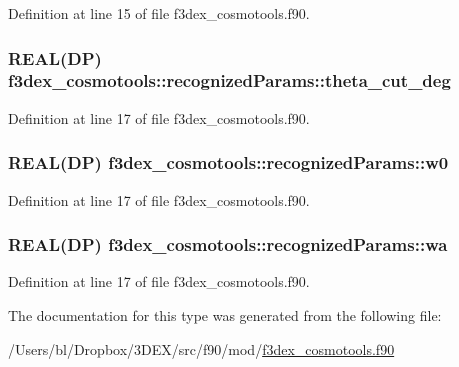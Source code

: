 Definition at line 15 of file f3dex\_\-cosmotools.f90.

\hypertarget{typef3dex__cosmotools_1_1recognized_params_ad67dc289e96be582ba36b4a960d36467}{
\subsubsection[{theta\_\-cut\_\-deg}]{\setlength{\rightskip}{0pt plus 5cm}REAL(DP) {\bf f3dex\_\-cosmotools::recognizedParams::theta\_\-cut\_\-deg}}}
\label{typef3dex__cosmotools_1_1recognized_params_ad67dc289e96be582ba36b4a960d36467}


Definition at line 17 of file f3dex\_\-cosmotools.f90.

\hypertarget{typef3dex__cosmotools_1_1recognized_params_acd2fc10976a6a78c250ab29f9a2fa547}{
\subsubsection[{w0}]{\setlength{\rightskip}{0pt plus 5cm}REAL(DP) {\bf f3dex\_\-cosmotools::recognizedParams::w0}}}
\label{typef3dex__cosmotools_1_1recognized_params_acd2fc10976a6a78c250ab29f9a2fa547}


Definition at line 17 of file f3dex\_\-cosmotools.f90.

\hypertarget{typef3dex__cosmotools_1_1recognized_params_a3e31572d077d164d5b2b6c62a772a6ba}{
\subsubsection[{wa}]{\setlength{\rightskip}{0pt plus 5cm}REAL(DP) {\bf f3dex\_\-cosmotools::recognizedParams::wa}}}
\label{typef3dex__cosmotools_1_1recognized_params_a3e31572d077d164d5b2b6c62a772a6ba}


Definition at line 17 of file f3dex\_\-cosmotools.f90.



The documentation for this type was generated from the following file:\begin{DoxyCompactItemize}
\item 
/Users/bl/Dropbox/3DEX/src/f90/mod/\hyperlink{f3dex__cosmotools_8f90}{f3dex\_\-cosmotools.f90}\end{DoxyCompactItemize}
